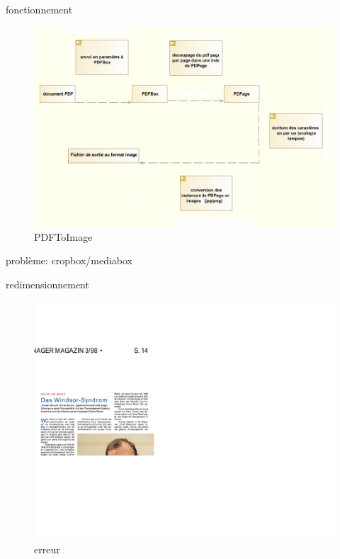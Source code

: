 \begin{frame}{fonctionnement}
		\begin{figure}[h]
        			\begin{center}
         			\includegraphics[scale=0.30]{images/pdfboxTraitement.png} 
        			\end{center}
        			\caption{PDFToImage}
        			\label{PDFToImage}
    		\end{figure}
\end{frame}

\begin{frame}{problème: cropbox/mediabox}
	\begin{block}{redimensionnement}
		\begin{figure}[h]
        		\begin{center}
         		\includegraphics[scale=0.08]{images/fail1.jpg} 
        		\end{center}
        		\caption{erreur}
        		\label{erreur}
    		\end{figure}
	\end{block}
\end{frame}

